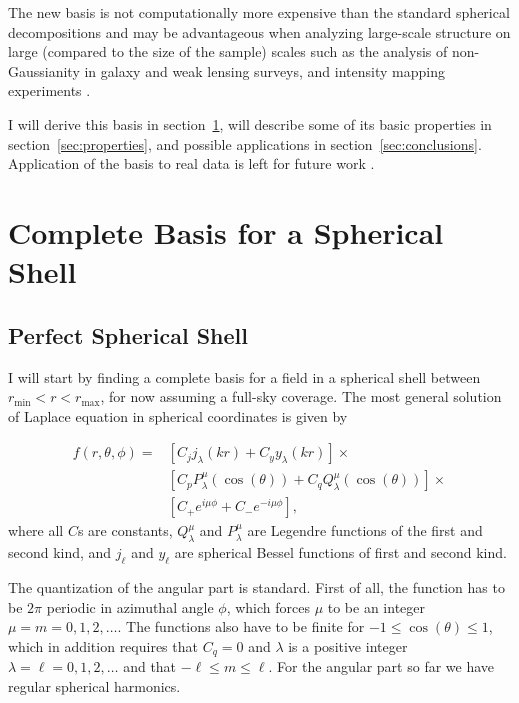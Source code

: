 \documentclass[fleqn,usenatbib]{mnras}
\newcommand{\rmin}{r_\mathrm{min}}
\newcommand{\rmax}{r_\mathrm{max}}
\begin{document}
The new basis is not computationally more expensive than the standard spherical
decompositions and may be advantageous when analyzing large-scale structure on
large (compared to the size of the sample) scales such as the analysis of
non-Gaussianity in galaxy and weak lensing surveys, and intensity mapping
experiments
\citep[e.g.,][]{2016ApJ...833..242L,2014MNRAS.442.1326K}.

I will derive this basis in section~\ref{sec:basis}, will describe some of
its basic properties in section~\ref{sec:properties}, and possible applications
in section~\ref{sec:conclusions}. Application of the basis to real data is left
for future work \citep[see,][for an example of how the new basis is used in
computing signal to noise of 21cm experiments]{Pullen2019}.

\section{Complete Basis for a Spherical Shell}
\label{sec:basis}

\subsection{Perfect Spherical Shell}
\label{ssec:perfectshell}

I will start by finding a complete basis for a field in a spherical shell
between $\rmin < r < \rmax$, for now assuming a full-sky coverage. The most
general solution of Laplace equation in spherical coordinates is given by

\begin{align} 
\label{eq:generalsol}
f(r,\theta,\phi) = &\left[C_jj_\lambda(kr) + C_yy_\lambda(kr)\right]\times\\
\nonumber
&\left [C_pP^\mu_\lambda (\cos (\theta)) + C_qQ^\mu_\lambda(\cos
(\theta))\right]\times\\
\nonumber
&\left[C_+e^{i\mu\phi} + C_-e^ {-i\mu\phi}\right],
\end{align} 
\noindent
where all $C$s are constants, $Q^\mu_\lambda$ and $P^\mu_\lambda$ are Legendre
functions of the first and second kind, and $j_\ell$ and $y_\ell$ are
spherical Bessel functions of first and second kind.

The quantization of the angular part is standard. First of all, the function
has to be $2\pi$ periodic in azimuthal angle $\phi$, which forces $\mu$ to be
an integer $\mu = m = 0, 1, 2, \ldots$. The functions also have to be finite
for $-1 \leq \cos(\theta) \leq 1$, which in addition requires that $C_q=0$ and
$\lambda$ is a positive integer $\lambda = \ell = 0, 1, 2, \ldots$ and that
$-\ell \leq m \leq \ell$.  For the angular part so far we have regular
spherical harmonics.
\end{document}

